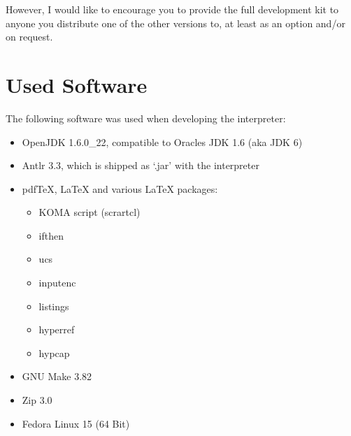 However, I would like to encourage you to provide the full development kit to anyone you distribute one of the other versions to, at least as an option and\slash{}or on request.

\section{Used Software}

The following software was used when developing the \setlX{} interpreter:

\begin{itemize}
	\item OpenJDK 1.6.0\_22, compatible to Oracles JDK 1.6 (aka JDK 6)
	\item Antlr 3.3, which is shipped as `.jar' with the interpreter
	\item pdf\TeX, \LaTeX{} and various \LaTeX{} packages:
		\begin{itemize}
			\item KOMA script (scrartcl)
			\item ifthen
			\item ucs
			\item inputenc
			\item listings
			\item hyperref
			\item hypcap
		\end{itemize}
	\item GNU Make 3.82
	\item Zip 3.0
	\item Fedora Linux 15 (64 Bit)
\end{itemize}


